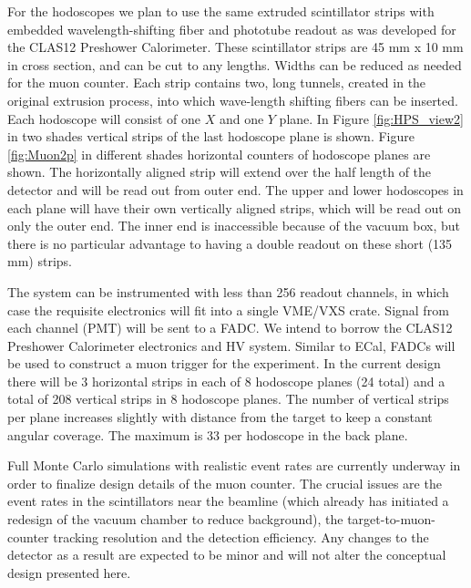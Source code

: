 For the hodoscopes we plan to use the same extruded scintillator strips with embedded wavelength-shifting fiber and phototube readout as was developed for the CLAS12 Preshower Calorimeter. These scintillator strips are 45 mm x 10 mm in cross section, and can be cut to any lengths. Widths can be reduced as needed for the muon counter. Each strip contains two, long tunnels, created in the original extrusion process, into which wave-length shifting fibers can be inserted.  Each hodoscope will consist of one $X$ and one $Y$ plane.  In Figure \ref{fig:HPS_view2} in two shades vertical strips of the last hodoscope plane is shown. Figure \ref{fig:Muon2p} in different shades horizontal counters of hodoscope planes are shown. The horizontally aligned strip will extend over the half length of the detector and will be read out from outer end.  The upper and lower hodoscopes in each plane will have their own vertically aligned strips, which will be read out on only the outer end.  The inner end is inaccessible because of the vacuum box, but there is no particular advantage to having a double readout on these short (135 mm) strips.  

The system can be instrumented with less than 256 readout channels, in which case the requisite electronics will 
fit into a single VME/VXS crate.  Signal from each channel (PMT) 
will be sent to a FADC.  We intend to borrow the CLAS12 Preshower Calorimeter electronics and HV system.  Similar to ECal, FADCs will be used to construct a muon trigger for the experiment.  In the current design there will be 3 horizontal strips in each of 8 hodoscope planes (24 total) and a total of 208 vertical strips in 8 hodoscope planes.  The number of vertical strips per plane increases slightly with distance from the target to keep a constant angular coverage.  The maximum is 33 per hodoscope in the back plane.

Full Monte Carlo simulations with realistic event rates are currently underway in order to finalize design details of the muon counter.  The crucial issues are the event rates in the scintillators near the beamline (which already has initiated a redesign of the vacuum chamber to reduce background), the target-to-muon-counter tracking resolution and the detection efficiency.  Any changes to the detector as a result are expected to be minor and will not alter the conceptual design presented here.

